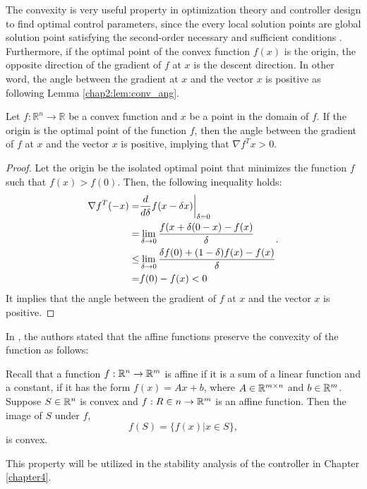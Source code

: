 The convexity is very useful property in optimization theory and controller design to find optimal control parameters, since the every local solution points are global solution point satisfying the second-order necessary and sufficient conditions \cite[Theorem 2.5]{RN9}.
Furthermore, if the optimal point of the convex function $f(x)$ is the origin, the opposite direction of the gradient of $f$ at $x$ is the descent direction.
In other word, the angle between the gradient at $x$ and the vector $x$ is positive as following Lemma \ref{chap2:lem:conv_ang}.

\begin{lemma}
  Let $f:\mathbb R^n\to \mathbb R$ be a convex function and $x$ be a point in the domain of $f$.
  If the origin is the optimal point of the function $f$, then the angle between the gradient of $f$ at $x$ and the vector $x$ is positive, implying that $\nabla f^Tx>0$.
  \label{chap2:lem:conv_ang}
\end{lemma}

\begin{proof}
  Let the origin be the isolated optimal point that minimizes the function $f$ such that $f(x) > f(0)$.
  Then, the following inequality holds:
  \begin{equation}
      \begin{aligned}
          \nabla f^T (-x)
          =&
          {d\over d\delta } f( x -\delta x)\bigg\vert _{\delta=0} \\
          =& \lim_{\delta\to 0} {f( x+\delta (0-x) - f( x)\over \delta}\\
          \le& \lim_{\delta\to0} {\delta f(0) + (1-\delta) f( x )-f( x)\over \delta}
          \\
          =& f(0) - f( x) < 0
          \end{aligned}
          .
  \end{equation}
  It implies that the angle between the gradient of $f$ at $x$ and the vector $x$ is positive.
\end{proof}

In \cite[Chapter 2.3.2]{RN1}, the authors stated that the affine functions preserve the convexity of the function as follows:
\begin{displayquote}
  
  Recall that a function $f:\mathbb{R}^n\to\mathbb{R}^m$ is affine if it is a sum of a linear function and a constant, \ie if it has the form $f(x) = Ax + b$, where $A\in\mathbb{R}^{m\times n}$ and $b\in\mathbb{R}^m$. Suppose $S\in\mathbb{R}^n$ is convex and $f:R\in n\to\mathbb{R}^m$ is an affine function. Then the image of $S$ under $f$,
  \begin{equation}
    f(S) = \{ f(x) | x\in S \}
    ,
  \end{equation}
  is convex.

\end{displayquote}
This property will be utilized in the stability analysis of the controller in Chapter \ref{chapter4}.

